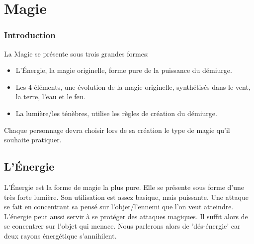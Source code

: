 
\section{Magie}
\subsubsection{Introduction}
La Magie se présente sous trois grandes formes:
\begin{itemize}
\item L'Énergie, la magie originelle, forme pure de la puissance du démiurge.
\item Les 4 éléments, une évolution de la magie originelle, synthétisés dans le vent, la terre, l'eau et le feu. 
\item La lumière/les ténèbres, utilise les règles de création du démiurge.
\end{itemize}
Chaque personnage devra choisir lors de sa création le type de magie qu'il souhaite pratiquer.
\subsection{L'Énergie}
L'Énergie est la forme de magie la plus pure. Elle se présente sous forme d'une très forte lumière. Son utilisation est assez basique, mais puissante. 
Une attaque se fait en concentrant sa pensé sur l'objet/l'ennemi que l'on veut atteindre.
L'énergie peut aussi servir à se protéger des attaques magiques. Il suffit alors de se concentrer sur l'objet qui menace. Nous parlerons alors de 'dés-énergie' car deux rayons énergétique s'annihilent. 
